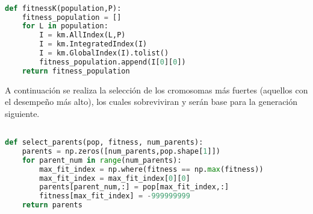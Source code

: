 \begin{lstlisting}[frame=single,language = python]  % Start your code-block

def fitnessK(population,P):
    fitness_population = []
    for L in population:
        I = km.AllIndex(L,P)
        I = km.IntegratedIndex(I)
        I = km.GlobalIndex(I).tolist()
        fitness_population.append(I[0][0])
    return fitness_population
\end{lstlisting}

A continuación se realiza la selección de los cromosomas más fuertes (aquellos con el desempeño más alto), los cuales sobreviviran y serán base para la generación siguiente.

\begin{lstlisting}[frame=single,language = python]  % Start your code-block

def select_parents(pop, fitness, num_parents):
    parents = np.zeros([num_parents,pop.shape[1]])
    for parent_num in range(num_parents):
        max_fit_index = np.where(fitness == np.max(fitness))
        max_fit_index = max_fit_index[0][0]
        parents[parent_num,:] = pop[max_fit_index,:]
        fitness[max_fit_index] = -999999999
    return parents
\end{lstlisting}





